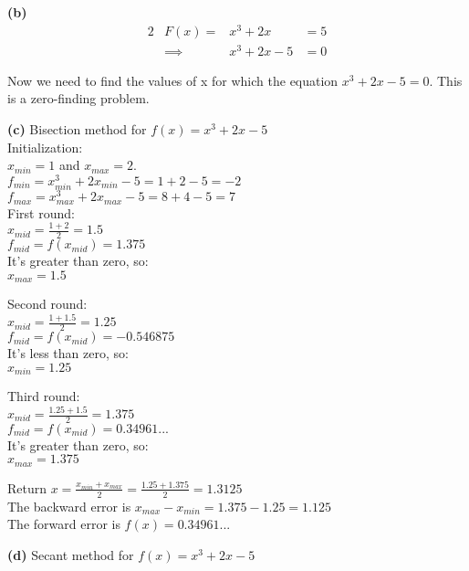 \documentclass[11pt,letterpaper]{article}
\renewcommand{\part}[1] {\vspace{.10in} {\bf (#1)}}
\begin{document}
\part{b}
\begin{alignat*}{2}
 & F(x)  = & x^{3} + 2x     & = 5\\
 &\implies & x^{3} + 2x - 5 & = 0
\end{alignat*}

Now we need to find the values of x for which the equation $x^{3} + 2x - 5 = 0$. This is a zero-finding problem.

\part{c}
Bisection method for $f(x) = x^{3} + 2x - 5$\\

Initialization:\\
$x_{min} = 1$ and $x_{max} = 2$.\\
$f_{min} = x_{min}^{3} + 2x_{min} - 5 = 1 + 2 - 5 = -2$\\
$f_{max} = x_{max}^{3} + 2x_{max} - 5 = 8 + 4 - 5 = 7$\\

First round:\\
$x_{mid} = \frac{1+2}{2} = 1.5$\\
$f_{mid} = f(x_{mid}) = 1.375 $\\
It's greater than zero, so:\\
$x_{max} = 1.5$

Second round:\\
$x_{mid} = \frac{1+1.5}{2} = 1.25$\\
$f_{mid} = f(x_{mid}) = -0.546875 $\\
It's less than zero, so:\\
$x_{min} = 1.25$

Third round:\\
$x_{mid} = \frac{1.25+1.5}{2} = 1.375$\\
$f_{mid} = f(x_{mid}) = 0.34961... $\\
It's greater than zero, so:\\
$x_{max} = 1.375$

Return $x = \frac{x_{min} + x_{max}}{2} = \frac{1.25 + 1.375}{2} = 1.3125$\\
The backward error is $x_{max} - x_{min} = 1.375 - 1.25 = 1.125$\\
The forward error is $f(x) = 0.34961...$


\part{d}
Secant method for $f(x) = x^{3} + 2x - 5$\\
\end{document}
